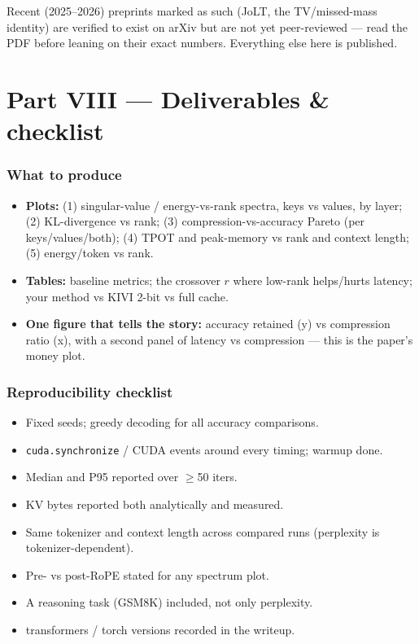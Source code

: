 \documentclass[11pt]{article}
\newcommand{\code}[1]{\texttt{\small #1}}
\begin{document}
\begin{tipbox}
Recent (2025--2026) preprints marked as such (JoLT, the TV/missed-mass identity) are verified to
exist on arXiv but are not yet peer-reviewed --- read the PDF before leaning on their exact
numbers. Everything else here is published.
\end{tipbox}

\part*{Part VIII \;---\; Deliverables \& checklist}

\section{What to produce}
\begin{itemize}[leftmargin=1.5em,itemsep=1pt]
\item \textbf{Plots:} (1) singular-value / energy-vs-rank spectra, keys vs values, by layer;
(2) KL-divergence vs rank; (3) compression-vs-accuracy Pareto (per keys/values/both);
(4) TPOT and peak-memory vs rank and context length; (5) energy/token vs rank.
\item \textbf{Tables:} baseline metrics; the crossover $r$ where low-rank helps/hurts latency;
your method vs KIVI 2-bit vs full cache.
\item \textbf{One figure that tells the story:} accuracy retained (y) vs compression ratio (x),
with a second panel of latency vs compression --- this is the paper's money plot.
\end{itemize}

\section{Reproducibility checklist}
\begin{itemize}[leftmargin=1.5em,itemsep=0pt]
\item[$\square$] Fixed seeds; greedy decoding for all accuracy comparisons.
\item[$\square$] \code{cuda.synchronize} / CUDA events around every timing; warmup done.
\item[$\square$] Median and P95 reported over $\ge$50 iters.
\item[$\square$] KV bytes reported both analytically and measured.
\item[$\square$] Same tokenizer and context length across compared runs (perplexity is tokenizer-dependent).
\item[$\square$] Pre- vs post-RoPE stated for any spectrum plot.
\item[$\square$] A reasoning task (GSM8K) included, not only perplexity.
\item[$\square$] transformers / torch versions recorded in the writeup.
\end{itemize}
\end{document}
